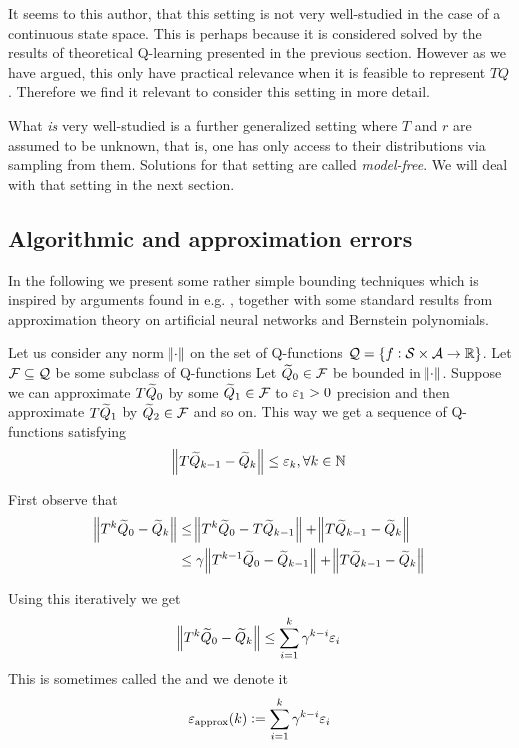 It seems to this author,
that this setting is not very well-studied in the case of a
continuous state space.
This is perhaps because it is considered solved
by the results of theoretical Q-learning presented in the previous section.
However as we have argued, this only have practical relevance 
when it is feasible to represent $TQ$.
Therefore we find it relevant to consider this setting in more detail.

What \emph{is} very well-studied is a further generalized setting
where $T$ and $r$ are assumed to be unknown,
that is, one has only access to their distributions via sampling from them.
Solutions for that setting are called \emph{model-free}.
We will deal with that setting in the next section.

\subsection{Algorithmic and approximation errors}

In the following we present some rather simple bounding techniques
which is inspired by arguments found in e.g. ,
together with some standard results from approximation theory
on artificial neural networks and Bernstein polynomials.

Let us consider any norm $\norm{\cdot}$ on
the set of Q-functions $\mathcal{Q} = \{ f: \mathcal{S} \times \mathcal{A} \to \mathbb{R} \}$.
Let $\mathcal{F} \subseteq \mathcal{Q}$ be some subclass of Q-functions
Let $\widetilde{Q}_0 \in \mathcal{F}$ be bounded in $\norm{\cdot}$.
Suppose we can approximate $T\widetilde{Q}_0$ by some $\widetilde{Q}_1 \in \mathcal{F}$
to $\varepsilon_1 > 0$ precision and then approximate $T\widetilde{Q}_1$ by $\widetilde{Q}_2 \in \mathcal{F}$
and so on. This way we get a sequence of Q-functions satisfying
\begin{equation}
\norm{T\widetilde{Q}_{k-1} - \widetilde{Q}_k} \leq \varepsilon_k, \forall k \in \mathbb{N}
\label{eq:defnvei}
\end{equation}

First observe that
\begin{align*}
  \norm{T^k \widetilde{Q}_0 - \widetilde{Q}_k}
  &\leq \norm{T^k \widetilde{Q}_0 - T \widetilde{Q}_{k-1}} + \norm{T\widetilde{Q}_{k-1} - \widetilde{Q}_k}
  \\ &\leq \gamma \norm{T^{k-1} \widetilde{Q}_0 - \widetilde{Q}_{k-1}}
  + \norm{T\widetilde{Q}_{k-1} - \widetilde{Q}_k}
\end{align*}

Using this iteratively we get
\begin{equation}
  \norm{T^k \widetilde{Q}_0 - \widetilde{Q}_k} \leq \sum_{i=1}^k \gamma^{k-i} \varepsilon_i
  \label{eq:mbitb}
\end{equation}
This is sometimes called the 
and we denote it
\begin{equation}
  \varepsilon_{\mathrm{approx}}(k) \vcentcolon= \sum_{i=1}^k \gamma^{k-i} \varepsilon_i
  \label{eq:defapproxe}
\end{equation}

